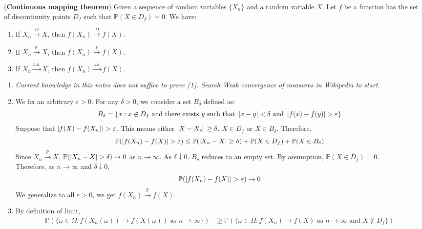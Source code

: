 \documentclass{huhtakm-template-book}
\newcommand{\prob}{\mathbb{P}}
\begin{document}
\newpage
\begin{thm}(\textbf{Continuous mapping theorem})
	Given a sequence of random variables $\{X_{n}\}$ and a random variable $X$. Let $f$ be a function has the set of discontinuity points $D_{f}$ such that $\prob(X\in D_{f})=0$. We have:
	\begin{enumerate}
		\item If $X_{n}\xrightarrow{D}X$, then $f(X_{n})\xrightarrow{D}f(X)$.
		\item If $X_{n}\xrightarrow{\prob}X$, then $f(X_{n})\xrightarrow{\prob}f(X)$.
		\item If $X_{n}\xrightarrow{\text{a.s.}}X$, then $f(X_{n})\xrightarrow{\text{a.s.}}f(X)$.
	\end{enumerate}
\end{thm}
\begin{proofing}
	\begin{enumerate}
		\item \textit{Current knowledge in this notes does not suffice to prove (1). Search Weak convergence of measures in Wikipedia to start.}
		\item We fix an arbitrary $\varepsilon>0$. For any $\delta>0$, we consider a set $B_{\delta}$ defined as:
		\begin{equation*}
			B_{\delta}=\{x:x\not\in D_{f}\text{ and there exists }y\text{ such that }\abs{x-y}<\delta\text{ and }\abs{f(x)-f(y)}>\varepsilon\}
		\end{equation*}
		Suppose that $\abs{f(X)-f(X_{n})}>\varepsilon$. This means either $\left|{X-X_{n}}\right|\geq\delta$, $X\in D_{f}$ or $X\in B_{\delta}$. Therefore,
		\begin{equation*}
			\prob(\abs{f(X_{n})-f(X)}>\varepsilon)\leq\prob(\abs{X_{n}-X}\geq\delta)+\prob(X\in D_{f})+\prob(X\in B_{\delta})
		\end{equation*}
		Since $X_{n}\xrightarrow{\prob}X$, $\prob(\abs{X_{n}-X}>\delta)\to 0$ as $n\to\infty$. As $\delta\downarrow 0$, $B_{\delta}$ reduces to an empty set. By assumption, $\prob(X\in D_{f})=0$.\\
		Therefore, as $n\to\infty$ and $\delta\downarrow 0$,
		\begin{equation*}
			\prob(\abs{f(X_{n})-f(X)}>\varepsilon)\to 0
		\end{equation*}
		We generalize to all $\varepsilon>0$, we get $f(X_{n})\xrightarrow{\prob}f(X)$.
		\item By definition of limit,
		\begin{align*}
			\prob(\{\omega\in\Omega:f(X_{n}(\omega))\to f(X(\omega))\text{ as }n\to\infty\})&\geq\prob(\{\omega\in\Omega:f(X_{n})\to f(X)\text{ as }n\to\infty\text{ and }X\not\in D_{f}\})\\

\end{align*}
\end{enumerate}
\end{proofing}
\end{document}
